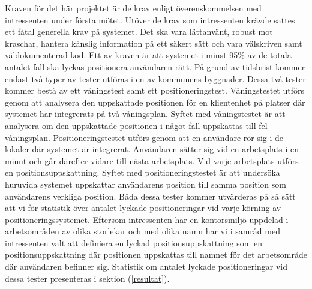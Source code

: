 \documentclass[swedish, a4paper,12pt]{article}
\begin{document}
%
%
%
%
%
Kraven för det här projektet är de krav enligt överenskommelsen med intressenten under första mötet. Utöver de krav som intressenten krävde sattes  ett fåtal generella krav på systemet. Det ska vara lättanvänt, robust mot kraschar, hantera känslig information på ett säkert sätt och vara välskriven samt väldokumenterad kod. Ett av kraven är att systemet i minst 95\% av de totala antalet fall ska lyckas positionera användaren rätt.
På grund av tidsbrist kommer endast två typer av tester utföras i en av kommunens byggnader. Dessa två tester kommer bestå av ett våningstest samt ett positioneringstest. Våningstestet utförs genom att analysera den uppskattade positionen för en klientenhet på platser där systemet har integrerats på två våningsplan. Syftet med våningstestet är att analysera om den uppskattade positionen i något fall uppskattas till fel våningsplan. Positioneringstestet utförs genom att en användare rör sig i de lokaler där systemet är integrerat. Användaren sätter sig vid en arbetsplats i en minut och går därefter vidare till nästa arbetsplats. Vid varje arbetsplats utförs en positionsuppskattning. Syftet med positioneringstestet är att undersöka huruvida systemet uppskattar användarens position till samma position som användarens verkliga position.
Båda dessa tester kommer utvärderas på så sätt att vi för statistik över antalet lyckade positioneringar vid varje körning av positioneringssystemet. Eftersom intressenten har en kontorsmiljö uppdelad i arbetsområden av olika storlekar och med olika namn har vi i samråd med intressenten valt att definiera en lyckad positionsuppskattning som en positionsuppskattning där  positionen uppskattas till namnet för det arbetsområde där användaren befinner sig.
Statistik om antalet lyckade positioneringar vid dessa tester presenteras i sektion (\ref{resultat}).
\end{document}
